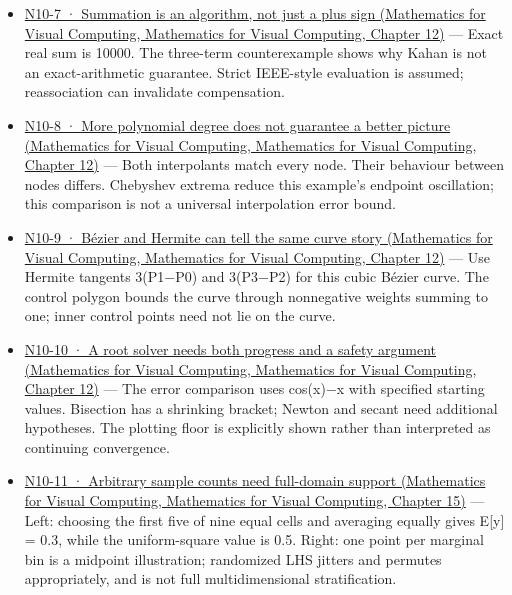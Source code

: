 \begin{itemize}
\item
  \href{../02-Mathematics-for-Visual-Computing/main.pdf\#nameddest=02-foundations-ii-ch028-figure-n10-7-summation-is-an-algorithm-not-just-a-plus-sign}{N10-7 · Summation is an algorithm, not just a plus sign (Mathematics for Visual Computing, Mathematics for Visual Computing, Chapter 12)} --- Exact real sum is 10000. The three-term counterexample shows why Kahan is not an exact-arithmetic guarantee. Strict IEEE-style evaluation is assumed; reassociation can invalidate compensation.
\item
  \href{../02-Mathematics-for-Visual-Computing/main.pdf\#nameddest=02-foundations-ii-ch028-figure-n10-8-more-polynomial-degree-does-not-guarantee-a-better-picture}{N10-8 · More polynomial degree does not guarantee a better picture (Mathematics for Visual Computing, Mathematics for Visual Computing, Chapter 12)} --- Both interpolants match every node. Their behaviour between nodes differs. Chebyshev extrema reduce this example's endpoint oscillation; this comparison is not a universal interpolation error bound.
\item
  \href{../02-Mathematics-for-Visual-Computing/main.pdf\#nameddest=02-foundations-ii-ch028-figure-n10-9-bézier-and-hermite-can-tell-the-same-curve-story}{N10-9 · Bézier and Hermite can tell the same curve story (Mathematics for Visual Computing, Mathematics for Visual Computing, Chapter 12)} --- Use Hermite tangents 3(P1−P0) and 3(P3−P2) for this cubic Bézier curve. The control polygon bounds the curve through nonnegative weights summing to one; inner control points need not lie on the curve.
\item
  \href{../02-Mathematics-for-Visual-Computing/main.pdf\#nameddest=02-foundations-ii-ch028-figure-n10-10-a-root-solver-needs-both-progress-and-a-safety-argument}{N10-10 · A root solver needs both progress and a safety argument (Mathematics for Visual Computing, Mathematics for Visual Computing, Chapter 12)} --- The error comparison uses cos(x)−x with specified starting values. Bisection has a shrinking bracket; Newton and secant need additional hypotheses. The plotting floor is explicitly shown rather than interpreted as continuing convergence.
\item
  \href{../02-Mathematics-for-Visual-Computing/main.pdf\#nameddest=02-foundations-ii-ch031-figure-n10-11-arbitrary-sample-counts-need-full-domain-support}{N10-11 · Arbitrary sample counts need full-domain support (Mathematics for Visual Computing, Mathematics for Visual Computing, Chapter 15)} --- Left: choosing the first five of nine equal cells and averaging equally gives E{[}y{]} = 0.3, while the uniform-square value is 0.5. Right: one point per marginal bin is a midpoint illustration; randomized LHS jitters and permutes appropriately, and is not full multidimensional stratification.

\end{itemize}
